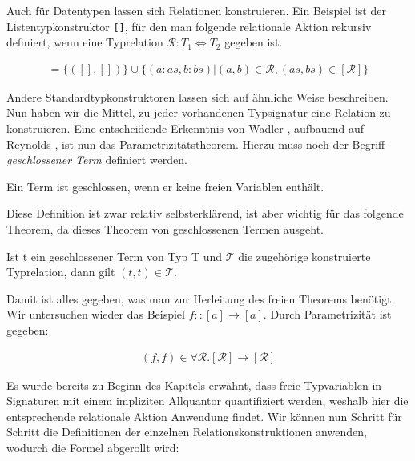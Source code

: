 Auch für Datentypen lassen sich Relationen konstruieren. Ein Beispiel ist der Listentypkonstruktor \texttt{[]}, für den man folgende
relationale Aktion rekursiv definiert, wenn eine Typ\-re\-lati\-on $\mathcal{R} : T_1 \Leftrightarrow T_2$ gegeben ist.

\begin{align*}
[\mathcal{R}] = \{ ([], []) \} \cup \{ (a : as, b : bs) | (a, b) \in \mathcal{R}, (as, bs) \in [\mathcal{R}] \}
\end{align*}

Andere Standardtypkonstruktoren lassen sich auf ähnliche Weise beschreiben. Nun haben wir die Mittel, zu jeder vorhandenen
Typsignatur eine Relation zu konstruieren. Eine entscheidende Erkenntnis von Wadler \cite{wadler}, aufbauend auf
Reynolds \cite{reynolds}, ist nun das Parametrizitätstheorem. Hierzu muss noch der Begriff \textit{geschlossener Term} definiert werden.

\begin{mydef}
Ein Term ist geschlossen, wenn er keine freien Variablen enthält.
\end{mydef}

Diese Definition ist zwar relativ selbsterklärend, ist aber wichtig für das folgende Theorem, da dieses Theorem von geschlossenen
Termen ausgeht.

\begin{mytheorem}[Parametrizität]
Ist t ein geschlossener Term von Typ T und $\mathcal{T}$ die zugehörige konstruierte Typrelation, dann gilt $(t, t) \in \mathcal{T}$.
\end{mytheorem}

Damit ist alles gegeben, was man zur Herleitung des freien Theorems benötigt. Wir untersuchen wieder das Beispiel
$f :: [a] \rightarrow [a]$. Durch Parametrizität ist gegeben:

\begin{align*}
(f, f) \in \forall \mathcal{R} . [\mathcal{R}] \rightarrow [\mathcal{R}]
\end{align*}

Es wurde bereits zu Beginn des Kapitels erwähnt, dass freie Typvariablen in Signaturen mit einem impliziten Allquantor
quantifiziert werden, weshalb hier die entsprechende relationale Aktion Anwendung findet.
Wir können nun Schritt für Schritt die Definitionen der einzelnen Relationskonstruktionen anwenden, wodurch die Formel
abgerollt wird: 

